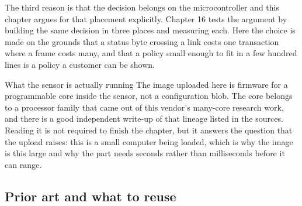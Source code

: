 The third reason is that the decision belongs on the microcontroller and this
chapter argues for that placement explicitly. Chapter 16 tests the argument by
building the same decision in three places and measuring each. Here the choice
is made on the grounds that a status byte crossing a link costs one transaction
where a frame costs many, and that a policy small enough to fit in a few hundred
lines is a policy a customer can be shown.

\begin{note}{What the sensor is actually running}
The image uploaded here is firmware for a programmable core inside the sensor,
not a configuration blob. The core belongs to a processor family that came out
of this vendor's many-core research work, and there is a good independent
write-up of that lineage listed in the sources. Reading it is not required to
finish the chapter, but it answers the question that the upload raises: this is
a small computer being loaded, which is why the image is this large and why the
part needs seconds rather than milliseconds before it can range.
\end{note}

\subsection*{Prior art and what to reuse}


